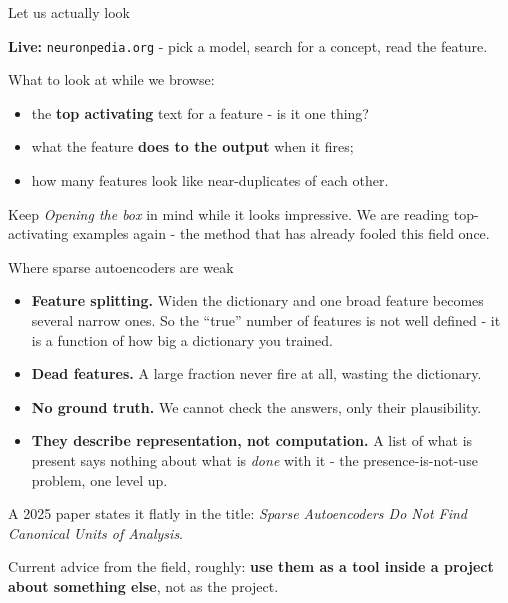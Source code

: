 \documentclass[aspectratio=169]{beamer}
\newcommand{\trapbox}[1]{%
  \begin{tcolorbox}[colback=armred!8, colframe=armred, boxrule=0.6pt, arc=2pt]
  #1
  \end{tcolorbox}}
\newcommand{\takebox}[1]{%
  \begin{tcolorbox}[colback=paramgreen!8, colframe=paramgreen, boxrule=0.6pt, arc=2pt]
  #1
  \end{tcolorbox}}
\newcommand{\watchbox}[1]{%
  \begin{tcolorbox}[colback=armorange!12, colframe=armorange, boxrule=0.6pt, arc=2pt]
  #1
  \end{tcolorbox}}
\newcommand{\demobox}[1]{%
  \begin{center}
  \begin{tcolorbox}[colback=violet1!8, colframe=violet1, boxrule=0.7pt, arc=2pt,
                    width=0.9\textwidth]
    \centering\textbf{Live:} #1
  \end{tcolorbox}
  \end{center}}
\begin{document}
\begin{frame}{Let us actually look}
  \vspace{1.0em}
  \demobox{\texttt{neuronpedia.org} - pick a model, search for a concept, read the feature.}

  \vspace{1.0em}
  What to look at while we browse:

  \vspace{0.5em}
  \begin{itemize}
    \item the \textbf{top activating} text for a feature - is it one thing?
    \item what the feature \textbf{does to the output} when it fires;
    \item how many features look like near-duplicates of each other.
  \end{itemize}

  \vspace{0.9em}
  \watchbox{Keep \emph{Opening the box} in mind while it looks impressive. We are reading top-activating
  examples again - the method that has already fooled this field once.}
\end{frame}

\begin{frame}{Where sparse autoencoders are weak}
  \vspace{0.5em}
  \begin{itemize}
    \item \textbf{Feature splitting.} Widen the dictionary and one broad feature becomes several
      narrow ones. So the ``true'' number of features is not well defined - it is a function of
      how big a dictionary you trained.
    \item \textbf{Dead features.} A large fraction never fire at all, wasting the dictionary.
    \item \textbf{No ground truth.} We cannot check the answers, only their plausibility.
    \item \textbf{They describe representation, not computation.} A list of what is present says
      nothing about what is \emph{done} with it - the presence-is-not-use problem, one level up.
  \end{itemize}

  \vspace{0.5em}
  \trapbox{\small A 2025 paper states it flatly in the title: \emph{Sparse Autoencoders Do Not
  Find Canonical Units of Analysis}.}

  \vspace{0.4em}
  \takebox{\small Current advice from the field, roughly: \textbf{use them as a tool inside a
  project about something else}, not as the project.}
\end{frame}
\end{document}
